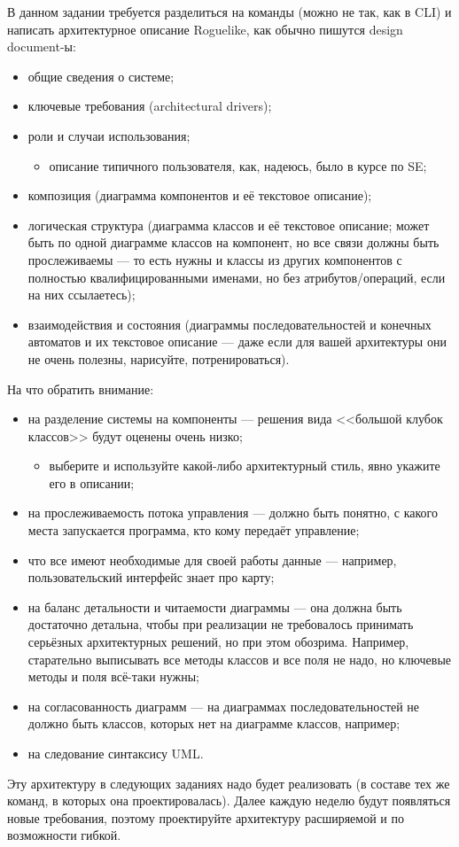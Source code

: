 \documentclass[a5paper]{homework}
\begin{document}
В данном задании требуется разделиться на команды (можно не так, как в CLI) и написать архитектурное описание Roguelike, как обычно пишутся design document-ы:

\begin{itemize}
    \item общие сведения о системе;
    \item ключевые требования (architectural drivers);
    \item роли и случаи использования;
    \begin{itemize}
        \item описание типичного пользователя, как, надеюсь, было в курсе по SE;
    \end{itemize}
    \item композиция (диаграмма компонентов и её текстовое описание);
    \item логическая структура (диаграмма классов и её текстовое описание; может быть по одной диаграмме классов на компонент, но все связи должны быть прослеживаемы --- то есть нужны и классы из других компонентов с полностью квалифицированными именами, но без атрибутов/операций, если на них ссылаетесь);
    \item взаимодействия и состояния (диаграммы последовательностей и конечных автоматов и их текстовое описание --- даже если для вашей архитектуры они не очень полезны, нарисуйте, потренироваться).
\end{itemize}

На что обратить внимание:

\begin{itemize}
    \item на разделение системы на компоненты --- решения вида <<большой клубок классов>> будут оценены очень низко;
    \begin{itemize}
        \item выберите и используйте какой-либо архитектурный стиль, явно укажите его в описании;
    \end{itemize}
    \item на прослеживаемость потока управления --- должно быть понятно, с какого места запускается программа, кто кому передаёт управление;
    \item что все имеют необходимые для своей работы данные --- например, пользовательский интерфейс знает про карту;
    \item на баланс детальности и читаемости диаграммы --- она должна быть достаточно детальна, чтобы при реализации не требовалось принимать серьёзных архитектурных решений, но при этом обозрима. Например, старательно выписывать все методы классов и все поля не надо, но ключевые методы и поля всё-таки нужны;
    \item на согласованность диаграмм --- на диаграммах последовательностей не должно быть классов, которых нет на диаграмме классов, например;
    \item на следование синтаксису UML.
\end{itemize}

Эту архитектуру в следующих заданиях надо будет реализовать (в составе тех же команд, в которых она проектировалась). Далее каждую неделю будут появляться новые требования, поэтому проектируйте архитектуру расширяемой и по возможности гибкой.
\end{document}
